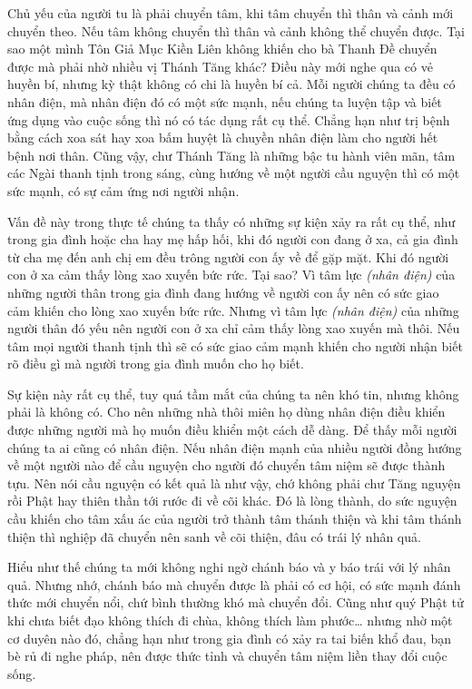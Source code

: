 \documentclass[
  12pt,
  oneside]{book}
\begin{document}
Chủ yếu của người tu là phải chuyển tâm, khi tâm chuyển thì thân và cảnh mới chuyển theo. Nếu tâm không chuyển thì thân và cảnh không thể chuyển được. Tại sao một mình Tôn Giả Mục Kiền Liên không khiến cho bà Thanh Đề chuyển được mà phải nhờ nhiều vị Thánh Tăng khác? Điều này mới nghe qua có vẻ huyền bí, nhưng kỳ thật không có chi là huyền bí cả. Mỗi người chúng ta đều có nhân điện, mà nhân điện đó có một sức mạnh, nếu chúng ta luyện tập và biết ứng dụng vào cuộc sống thì nó có tác dụng rất cụ thể. Chẳng hạn như trị bệnh bằng cách xoa sát hay xoa bấm huyệt là chuyền nhân điện làm cho người hết bệnh nơi thân. Cũng vậy, chư Thánh Tăng là những bậc tu hành viên mãn, tâm các Ngài thanh tịnh trong sáng, cùng hướng về một người cầu nguyện thì có một sức mạnh, có sự cảm ứng nơi người nhận.

Vấn đề này trong thực tế chúng ta thấy có những sự kiện xảy ra rất cụ thể, như trong gia đình hoặc cha hay mẹ hấp hối, khi đó người con đang ở xa, cả gia đình từ cha mẹ đến anh chị em đều trông người con ấy về để gặp mặt. Khi đó người con ở xa cảm thấy lòng xao xuyến bức rức. Tại sao? Vì tâm lực \emph{(nhân điện)} của những người thân trong gia đình đang hướng về người con ấy nên có sức giao cảm khiến cho lòng xao xuyến bức rức. Nhưng vì tâm lực \emph{(nhân điện)} của những người thân đó yếu nên người con ở xa chỉ cảm thấy lòng xao xuyến mà thôi. Nếu tâm mọi người thanh tịnh thì sẽ có sức giao cảm mạnh khiến cho người nhận biết rõ điều gì mà người trong gia đình muốn cho họ biết.

Sự kiện này rất cụ thể, tuy quá tầm mắt của chúng ta nên khó tin, nhưng không phải là không có. Cho nên những nhà thôi miên họ dùng nhân điện điều khiển được những người mà họ muốn điều khiển một cách dễ dàng. Để thấy mỗi người chúng ta ai cũng có nhân điện. Nếu nhân điện mạnh của nhiều người đồng hướng về một người nào để cầu nguyện cho người đó chuyển tâm niệm sẽ được thành tựu. Nên nói cầu nguyện có kết quả là như vậy, chớ không phải chư Tăng nguyện rồi Phật hay thiên thần tới rước đi về cõi khác. Đó là lòng thành, do sức nguyện cầu khiến cho tâm xấu ác của người trở thành tâm thánh thiện và khi tâm thánh thiện thì nghiệp đã chuyển nên sanh về cõi thiện, đâu có trái lý nhân quả.

Hiểu như thế chúng ta mới không nghi ngờ chánh báo và y báo trái với lý nhân quả. Nhưng nhớ, chánh báo mà chuyển được là phải có cơ hội, có sức mạnh đánh thức mới chuyển nổi, chứ bình thường khó mà chuyển đổi. Cũng như quý Phật tử khi chưa biết đạo không thích đi chùa, không thích làm phước\ldots{} nhưng nhờ một cơ duyên nào đó, chẳng hạn như trong gia đình có xảy ra tai biến khổ đau, bạn bè rủ đi nghe pháp, nên được thức tỉnh và chuyển tâm niệm liền thay đổi cuộc sống.
\end{document}
